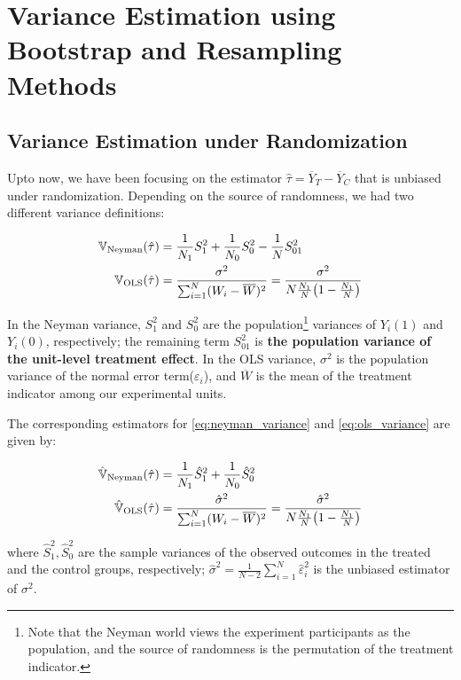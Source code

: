 \section{Variance Estimation using Bootstrap and Resampling Methods}

\subsection{Variance Estimation under Randomization}

Upto now, we have been focusing on the estimator $\hat\tau=\overline{Y}_T-\overline{Y}_C$ that is unbiased under randomization.
Depending on the source of randomness, we had two different variance definitions:

\begin{align}
    {\mathbb{V}}_\text{Neyman}(\hat\tau) &= \frac{1}{N_1}S_1^2 + \frac{1}{N_0}S_0^2 - \frac{1}{N}S_{01}^2\label{eq:neyman_variance}\\
    {\mathbb{V}}_\text{OLS}(\hat\tau) &= \frac{\sigma^2}{\sum_{i=1}^N (W_i - \overline{W})^2} = \frac{\sigma^2}{N\frac{N_1}{N}\bigl(1- \frac{N_1}{N}\bigr)}\label{eq:ols_variance}
\end{align}

In the Neyman variance, $S_1^2$ and $S_0^2$ are the population\footnote{Note that the Neyman world views the experiment participants as the population, and the source of randomness is the permutation of the treatment indicator.} variances of $Y_i(1)$ and $Y_i(0)$, respectively; 
the remaining term $S_{01}^2$ is \textbf{the population variance of the unit-level treatment effect}.
In the OLS variance, $\sigma^2$ is the population variance of the normal error term($\varepsilon_i$), and $\overline{W}$ is the mean of the treatment indicator among our experimental units.

The corresponding estimators for \eqref{eq:neyman_variance} and \eqref{eq:ols_variance} are given by:

\begin{align}
    \hat{{\mathbb{V}}}_\text{Neyman}(\hat\tau) &= \frac{1}{N_1}\hat{S}_1^2 + \frac{1}{N_0}\hat{S}_0^2 \label{eq:neyman_variance_estimator}\\
    \hat{{\mathbb{V}}}_\text{OLS}(\hat\tau) &= \frac{\hat{\sigma}^2}{\sum_{i=1}^N (W_i - \overline{W})^2} = \frac{\hat{\sigma}^2}{N\frac{N_1}{N}\bigl(1- \frac{N_1}{N}\bigr)}\label{eq:ols_variance_estimator}
\end{align}

where $\hat{S}_1^2, \hat{S}_0^2$ are the sample variances of the observed outcomes in the treated and the control groups, respectively; $\hat{\sigma}^2 = \frac{1}{N-2}\sum_{i=1}^N \hat{\varepsilon}_i^2$ is the unbiased estimator of $\sigma^2$.


